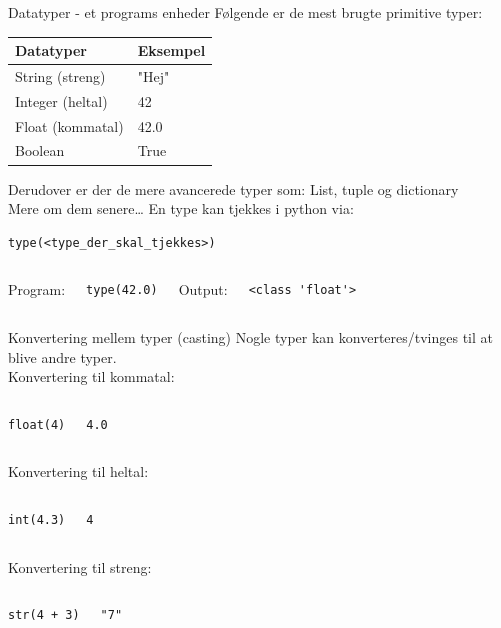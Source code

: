 \documentclass[10pt]{beamer}
\begin{document}
\begin{frame}[fragile]{Datatyper - et programs enheder}
	Følgende er de mest brugte primitive typer: 
	\begin{center}
		\begin{tabular}{ll}
		\hline
		Datatyper			&		Eksempel 	\\ \hline \hline
		String (streng)		&		"Hej"		\\
		Integer (heltal)	&		42			\\
		Float (kommatal)	&		42.0		\\
		Boolean				&		True		\\
		\end{tabular}
	\end{center}
	Derudover er der de mere avancerede typer som: List, tuple og dictionary\\
	Mere om dem senere\dots
	En type kan tjekkes i python via:
	\begin{lstlisting}[style=python]
type(<type_der_skal_tjekkes>)
	\end{lstlisting}
	\begin{columns}
		Program:
		\begin{lstlisting}[style=python]
	type(42.0)
		\end{lstlisting}
		Output:
		\begin{lstlisting}[style=python]
	<class 'float'>
		\end{lstlisting}
	\end{columns}
\end{frame}

\begin{frame}[fragile]{Konvertering mellem typer (casting)}
	Nogle typer kan konverteres/tvinges til at blive andre typer.\\
	Konvertering til kommatal:
	\begin{columns}
		\column{0.4\textwidth}
		\begin{lstlisting}[style=python]
float(4)
		\end{lstlisting}
		\column{0.4\textwidth}
		\begin{lstlisting}[style=python]
4.0
		\end{lstlisting}
	\end{columns}
	Konvertering til heltal:
	\begin{columns}
		\begin{lstlisting}[style=python]
int(4.3)
		\end{lstlisting}
		\begin{lstlisting}[style=python]
4
		\end{lstlisting}
	\end{columns}
	Konvertering til streng:
	\begin{columns}
		\column{0.4\textwidth}
		\begin{lstlisting}[style=python]
str(4 + 3)
		\end{lstlisting}
		\column{0.4\textwidth}
		\begin{lstlisting}[style=python]
"7"
		\end{lstlisting}
	\end{columns}
\end{frame}
\end{document}
